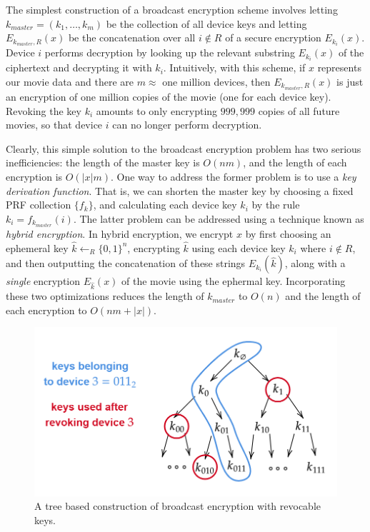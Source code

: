 The simplest construction of a broadcast encryption scheme involves
letting \(k_{master} = (k_1, \ldots, k_m)\) be the collection of all
device keys and letting \(E_{k_{master}, R}(x)\) be the concatenation
over all \(i \notin R\) of a secure encryption \(E_{k_i}(x)\). Device
\(i\) performs decryption by looking up the relevant substring
\(E_{k_i}(x)\) of the ciphertext and decrypting it with \(k_i\).
Intuitively, with this scheme, if \(x\) represents our movie data and
there are \(m \approx\) one million devices, then
\(E_{k_{master}, R}(x)\) is just an encryption of one million copies of
the movie (one for each device key). Revoking the key \(k_i\) amounts to
only encrypting \(999,999\) copies of all future movies, so that device
\(i\) can no longer perform decryption.

Clearly, this simple solution to the broadcast encryption problem has
two serious inefficiencies: the length of the master key is \(O(nm)\),
and the length of each encryption is \(O(|x|m)\). One way to address the
former problem is to use a \emph{key derivation function}. That is, we
can shorten the master key by choosing a fixed PRF collection
\(\{f_k\}\), and calculating each device key \(k_i\) by the rule
\(k_i = f_{k_{master}}(i)\). The latter problem can be addressed using a
technique known as \emph{hybrid encryption}. In hybrid encryption, we
encrypt \(x\) by first choosing an ephemeral key
\(\hat k \leftarrow_R \{0,1\}^n\), encrypting \(\hat k\) using each
device key \(k_i\) where \(i \notin R\), and then outputting the
concatenation of these strings \(E_{k_i}(\hat k)\), along with a
\emph{single} encryption \(E_{\hat k}(x)\) of the movie using the
ephermal key. Incorporating these two optimizations reduces the length
of \(k_{master}\) to \(O(n)\) and the length of each encryption to
\(O(nm + |x|)\).

\begin{figure}
\centering
\includegraphics[width=\textwidth, height=0.25\paperheight, keepaspectratio]{../figure/brdcasttreefig.png}
\caption{A tree based construction of broadcast encryption with
revocable keys.}
\label{brdcasttreefig}
\end{figure}

